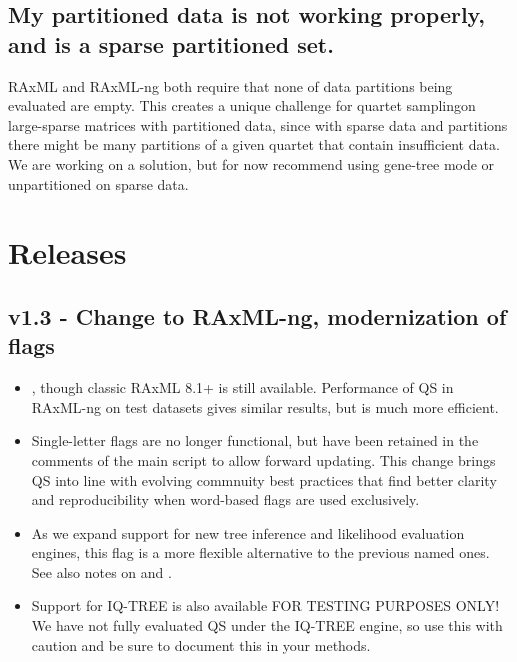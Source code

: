 \documentclass[letterpaper,12pt,english]{sphinxmanual}
\begin{document}
\section{My partitioned data is not working properly, and is a sparse partitioned set.}
\label{\detokenize{faq:my-partitioned-data-is-not-working-properly-and-is-a-sparse-partitioned-set}}
RAxML and RAxML-ng both require that none of data partitions being evaluated are empty.  This creates a unique challenge for quartet samplingon large-sparse matrices with partitioned data, since with sparse data and partitions there might be many partitions of a given quartet that contain insufficient data.  We are working on a solution, but for now recommend using gene-tree mode or unpartitioned on sparse data.


\chapter{Releases}
\label{\detokenize{releases::doc}}\label{\detokenize{releases:id1}}\label{\detokenize{releases:releases}}

\section{v1.3 - Change to RAxML-ng, modernization of flags}
\label{\detokenize{releases:v1-3-change-to-raxml-ng-modernization-of-flags}}\begin{itemize}
\item {} 
, though classic RAxML 8.1+ is still available.  Performance of QS in RAxML-ng on test datasets gives similar results, but is much more efficient.

\item {} 
 Single-letter flags are no longer functional, but have been retained in the comments of the main  script to allow forward updating.  This change brings QS into line with evolving commnuity best practices that find better clarity and reproducibility when word-based flags are used exclusively.

\item {} 
 As we expand support for new tree inference and likelihood evaluation engines, this flag is a more flexible alternative to the previous named ones.  See also notes on  and .

\item {} 
Support for IQ-TREE is also available FOR TESTING PURPOSES ONLY!  We have not fully evaluated QS under the IQ-TREE engine, so use this with caution and be sure to document this in your methods.

\end{itemize}
\end{document}

